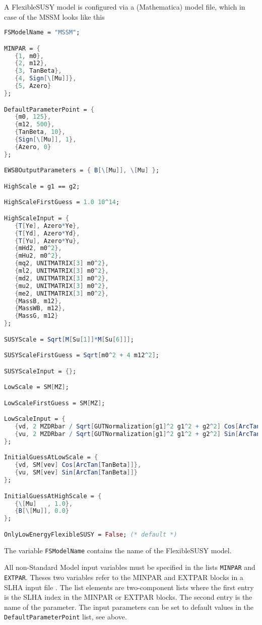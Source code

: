 \documentclass[final,3p,times,pdflatex]{elsarticle}
\newcommand{\fs}{FlexibleSUSY\xspace}
\newcommand{\code}[1]{\lstinline|#1|}  %
\begin{document}
A \fs model is configured via a (Mathematica) model file, which in
case of the MSSM looks like this
%
\begin{lstlisting}[language=Mathematica]
FSModelName = "MSSM";

MINPAR = {
   {1, m0},
   {2, m12},
   {3, TanBeta},
   {4, Sign[\[Mu]]},
   {5, Azero}
};

DefaultParameterPoint = {
   {m0, 125},
   {m12, 500},
   {TanBeta, 10},
   {Sign[\[Mu]], 1},
   {Azero, 0}
};

EWSBOutputParameters = { B[\[Mu]], \[Mu] };

HighScale = g1 == g2;

HighScaleFirstGuess = 1.0 10^14;

HighScaleInput = {
   {T[Ye], Azero*Ye},
   {T[Yd], Azero*Yd},
   {T[Yu], Azero*Yu},
   {mHd2, m0^2},
   {mHu2, m0^2},
   {mq2, UNITMATRIX[3] m0^2},
   {ml2, UNITMATRIX[3] m0^2},
   {md2, UNITMATRIX[3] m0^2},
   {mu2, UNITMATRIX[3] m0^2},
   {me2, UNITMATRIX[3] m0^2},
   {MassB, m12},
   {MassWB, m12},
   {MassG, m12}
};

SUSYScale = Sqrt[M[Su[1]]*M[Su[6]]];

SUSYScaleFirstGuess = Sqrt[m0^2 + 4 m12^2];

SUSYScaleInput = {};

LowScale = SM[MZ];

LowScaleFirstGuess = SM[MZ];

LowScaleInput = {
   {vd, 2 MZDRbar / Sqrt[GUTNormalization[g1]^2 g1^2 + g2^2] Cos[ArcTan[TanBeta]]},
   {vu, 2 MZDRbar / Sqrt[GUTNormalization[g1]^2 g1^2 + g2^2] Sin[ArcTan[TanBeta]]}
};

InitialGuessAtLowScale = {
   {vd, SM[vev] Cos[ArcTan[TanBeta]]},
   {vu, SM[vev] Sin[ArcTan[TanBeta]]}
};

InitialGuessAtHighScale = {
   {\[Mu]   , 1.0},
   {B[\[Mu]], 0.0}
};

OnlyLowEnergyFlexibleSUSY = False; (* default *)
\end{lstlisting}
%
The variable \code{FSModelName} contains the name of the \fs model.

All non-Standard Model input variables must be specified in the lists
\code{MINPAR} and \code{EXTPAR}.  Theses two variables refer to the
MINPAR and EXTPAR blocks in a SLHA input file \cite{Skands:2003cj}.
The list elements are two-component lists where the first entry is the
SLHA index in the MINPAR or EXTPAR blocks.  The second entry is the
name of the parameter.  The input parameters can be set to default
values in the \code{DefaultParameterPoint} list, see above.
\end{document}
